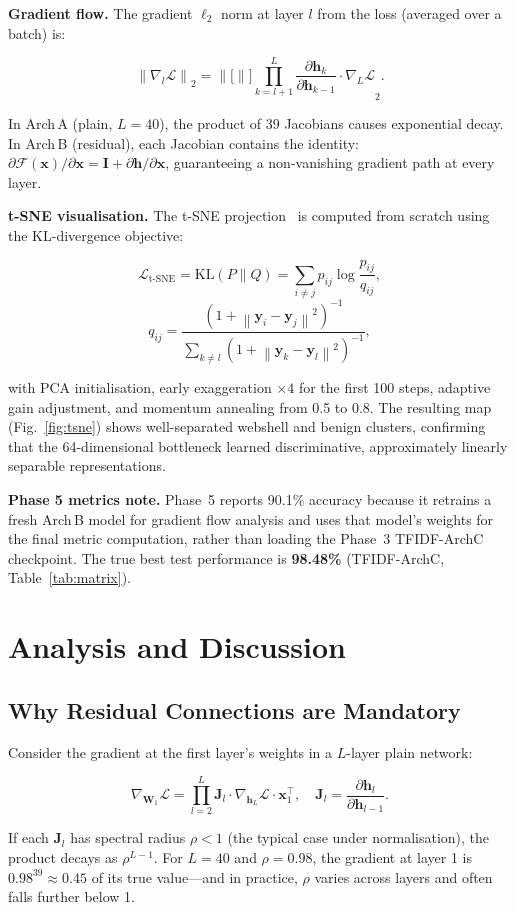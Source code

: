 \documentclass[10pt,conference,letterpaper]{IEEEtran}
\newcommand{\norm}[1]{\left\lVert#1\right\rVert}
\begin{document}
\textbf{Gradient flow.}
The gradient $\ell_2$ norm at layer $l$ from the loss (averaged over a batch) is:
\begin{tcolorbox}[eqbox]
\[
  \norm{\nabla_l\mathcal{L}}_2
  = \norm[\Bigg]{\prod_{k=l+1}^{L}\frac{\partial\bm{h}_k}{\partial\bm{h}_{k-1}}
    \cdot\nabla_L\mathcal{L}}_2.
\]
\end{tcolorbox}
In Arch\,A (plain, $L=40$), the product of 39 Jacobians causes exponential
decay. In Arch\,B (residual), each Jacobian contains the identity:
$\partial\mathcal{F}(\bm{x})/\partial\bm{x}=\bm{I}+\partial\bm{h}/\partial\bm{x}$,
guaranteeing a non-vanishing gradient path at every layer.

\textbf{t-SNE visualisation.}
The t-SNE projection~\cite{maaten2008tsne} is computed from scratch using the
KL-divergence objective:
\begin{tcolorbox}[eqbox]
\[
  \mathcal{L}_\text{t-SNE} = \mathrm{KL}(P\|Q)
  = \sum_{i\neq j}p_{ij}\log\frac{p_{ij}}{q_{ij}},
\]
\[
  q_{ij} = \frac{(1+\norm{\bm{y}_i-\bm{y}_j}^2)^{-1}}
               {\sum_{k\neq l}(1+\norm{\bm{y}_k-\bm{y}_l}^2)^{-1}},
\]
\end{tcolorbox}
with PCA initialisation, early exaggeration $\times4$ for the first 100 steps,
adaptive gain adjustment, and momentum annealing from 0.5 to 0.8. The resulting
map (Fig.~\ref{fig:tsne}) shows well-separated webshell and benign clusters,
confirming that the 64-dimensional bottleneck learned discriminative,
approximately linearly separable representations.

\textbf{Phase 5 metrics note.}
Phase~5 reports 90.1\% accuracy because it retrains a fresh Arch\,B model for
gradient flow analysis and uses that model's weights for the final metric
computation, rather than loading the Phase~3 TFIDF-ArchC checkpoint.
The true best test performance is \textbf{98.48\%} (TFIDF-ArchC, Table~\ref{tab:matrix}).

\section{Analysis and Discussion}
\label{sec:disc}

\subsection{Why Residual Connections are Mandatory}

Consider the gradient at the first layer's weights in a $L$-layer plain network:
\begin{tcolorbox}[eqbox]
\[
  \nabla_{\bm{W}_1}\mathcal{L}
  = \prod_{l=2}^{L}\bm{J}_l\cdot\nabla_{\bm{h}_L}\mathcal{L}\cdot\bm{x}_1^\top,
  \quad\bm{J}_l = \frac{\partial\bm{h}_l}{\partial\bm{h}_{l-1}}.
\]
\end{tcolorbox}
If each $\bm{J}_l$ has spectral radius $\rho<1$ (the typical case under
normalisation), the product decays as $\rho^{L-1}$. For $L=40$ and $\rho=0.98$,
the gradient at layer 1 is $0.98^{39}\approx0.45$ of its true value---and in
practice, $\rho$ varies across layers and often falls further below 1.
\end{document}
